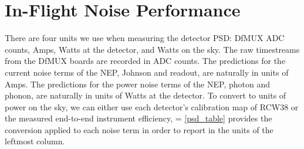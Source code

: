 


\section{In-Flight Noise Performance}
\label{sec:flight_noise_performance}

There are four units we use when measuring the detector \ac{PSD}: \ac{DfMUX} \ac{ADC} counts, Amps, Watts at the detector, and Watts on the sky. 
The raw timestreams from the \ac{DfMUX} boards are recorded in \ac{ADC} counts. 
The predictions for the current noise terms of the \ac{NEP}, Johnson and readout, are naturally in units of Amps.
The predictions for the power noise terms of the \ac{NEP}, photon and phonon, are naturally in units of Watts at the detector. 
To convert to units of power on the sky, we can either use each detector's calibration map of RCW38 or the measured end-to-end instrument efficiency, 
\be
\varepsilon = 
\label{eq:eff_ratio}
\ee
\TAB\ref{psd_table} provides the conversion applied to each noise term in order to report in the units of the leftmost column. 

